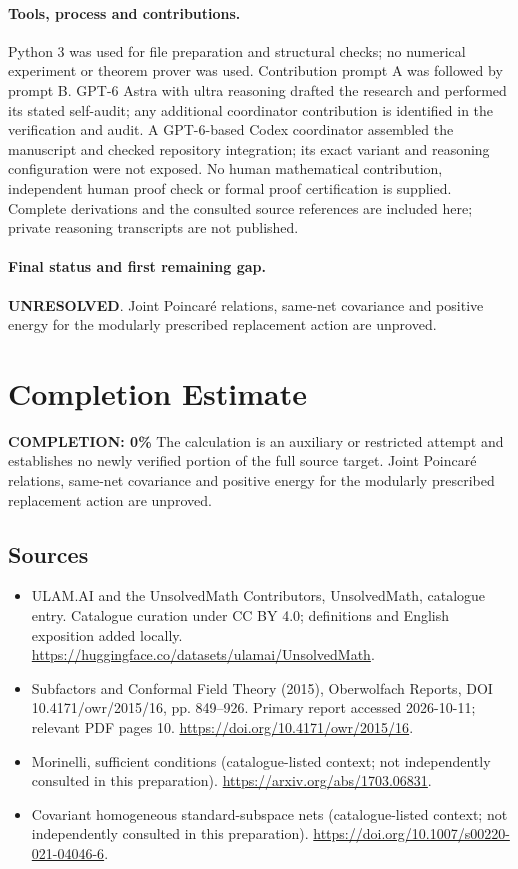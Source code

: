 \documentclass[11pt]{article}
\begin{document}
\paragraph{Tools, process and contributions.}
Python 3 was used for file preparation and structural checks; no numerical experiment or theorem prover was used. Contribution prompt A was followed by prompt B. GPT-6 Astra with ultra reasoning drafted the research and performed its stated self-audit; any additional coordinator contribution is identified in the verification and audit. A GPT-6-based Codex coordinator assembled the manuscript and checked repository integration; its exact variant and reasoning configuration were not exposed. No human mathematical contribution, independent human proof check or formal proof certification is supplied. Complete derivations and the consulted source references are included here; private reasoning transcripts are not published.

\paragraph{Final status and first remaining gap.}
\textbf{UNRESOLVED}. Joint Poincaré relations, same-net covariance and positive energy for the modularly prescribed replacement action are unproved.

\section{Completion Estimate}
\noindent\textbf{COMPLETION: 0\%}
The calculation is an auxiliary or restricted attempt and establishes no newly verified portion of the full source target. Joint Poincaré relations, same-net covariance and positive energy for the modularly prescribed replacement action are unproved.

\subsection{Sources}
\begin{itemize}
\item[\hypertarget{source:statement:1}{S1}] ULAM.AI and the UnsolvedMath Contributors, UnsolvedMath, catalogue entry. Catalogue curation under CC BY 4.0; definitions and English exposition added locally.
\url{https://huggingface.co/datasets/ulamai/UnsolvedMath}.
\item[\hypertarget{source:statement:2}{S2}] Subfactors and Conformal Field Theory (2015), Oberwolfach Reports, DOI 10.4171/owr/2015/16, pp. 849--926. Primary report accessed 2026-10-11; relevant PDF pages 10.
\url{https://doi.org/10.4171/owr/2015/16}.
\item[\hypertarget{source:statement:3}{S3}] Morinelli, sufficient conditions (catalogue-listed context; not independently consulted in this preparation).
\url{https://arxiv.org/abs/1703.06831}.
\item[\hypertarget{source:statement:4}{S4}] Covariant homogeneous standard-subspace nets (catalogue-listed context; not independently consulted in this preparation).
\url{https://doi.org/10.1007/s00220-021-04046-6}.
\end{itemize}
\label{end:statement}
\end{document}
